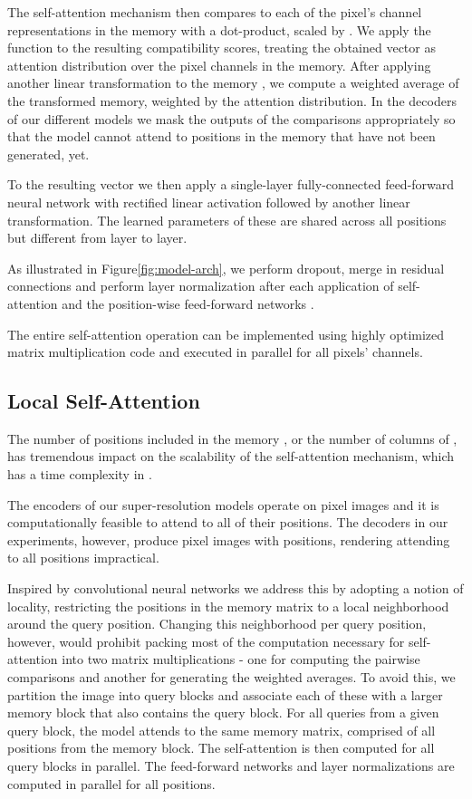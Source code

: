 \documentclass{article}
\begin{document}
The self-attention mechanism then compares  to each of the pixel's channel representations in the memory with a dot-product, scaled by . We apply the  function to the resulting compatibility scores, treating the obtained vector as attention distribution over the pixel channels in the memory. After applying another linear transformation  to the memory , we compute a weighted average of the transformed memory, weighted by the attention distribution. In the decoders of our different models we mask the outputs of the comparisons appropriately so that the model cannot attend to positions in the memory that have not been generated, yet.

To the resulting vector we then apply a single-layer fully-connected feed-forward neural network with rectified linear activation followed by another linear transformation. The learned parameters of these are shared across all positions but different from layer to layer.

As illustrated in Figure\ref{fig:model-arch}, we perform dropout, merge in residual connections and perform layer normalization after each application of self-attention and the position-wise feed-forward networks \citep{layernorm2016, srivastava2014dropout}.

The entire self-attention operation can be implemented using highly optimized matrix multiplication code and executed in parallel for all pixels' channels.







\subsection{Local Self-Attention}
\label{sec:local-self-attention}

The number of positions included in the memory , or the number of columns of , has tremendous impact on the scalability of the self-attention mechanism, which has a time complexity in .

The encoders of our super-resolution models operate on  pixel images and it is computationally feasible to attend to all of their  positions. The decoders in our experiments, however, produce  pixel images with  positions, rendering attending to all positions impractical.

Inspired by convolutional neural networks we address this by adopting a notion of locality, restricting the positions in the memory matrix  to a local neighborhood around the query position. Changing this neighborhood per query position, however, would prohibit packing most of the computation necessary for self-attention into two matrix multiplications - one for computing the pairwise comparisons and another for generating the weighted averages. To avoid this, we partition the image into query blocks and associate each of these with a larger memory block that also contains the query block. For all queries from a given query block, the model attends to the same memory matrix, comprised of all positions from the memory block.
The self-attention is then computed for all query blocks in parallel.
The feed-forward networks and layer normalizations are computed in parallel for all positions.
\end{document}
